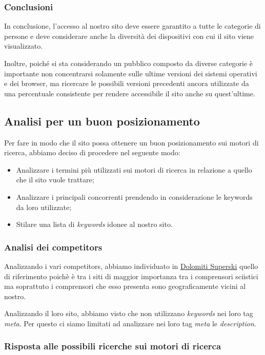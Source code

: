 \subsubsection{Conclusioni}

In conclusione, l'accesso al nostro sito deve essere garantito a tutte le categorie di persone e deve considerare anche la diversità
dei dispositivi con cui il sito viene visualizzato.

Inoltre, poiché si sta considerando un pubblico composto da diverse categorie è importante non concentrarsi solamente sulle ultime versioni
dei sistemi operativi e dei browser, ma ricercare le possibili versioni precedenti ancora utilizzate da una percentuale consistente per rendere
accessibile il sito anche su quest'ultime.

\subsection{Analisi per un buon posizionamento}

Per fare in modo che il sito possa ottenere un buon posizionamento sui motori di ricerca, abbiamo deciso di procedere nel seguente modo:
\begin{itemize}
    \item Analizzare i termini più utilizzati sui motori di ricerca in relazione a quello che il sito vuole trattare;
    \item Analizzare i principali concorrenti prendendo in considerazione le keywords da loro utilizzate;
    \item Stilare una lista di \textit{keywords} idonee al nostro sito.
\end{itemize}

\subsubsection{Analisi dei competitors}

Analizzando i vari competitors, abbiamo individuato in \href{www.dolomitisuperski.com}{Dolomiti Superski} quello di riferimento poichè è tra i siti di maggior 
importanza tra i comprensori sciistici ma soprattuto i comprensori che esso presenta sono geograficamente vicini al nostro.

Analizzando il loro sito, abbiamo visto che non utilizzano \textit{keywords} nei loro tag \textit{meta}. Per questo ci siamo limitati ad analizzare nei loro
tag \textit{meta} le \textit{description}.

\subsubsection{Risposta alle possibili ricerche sui motori di ricerca}

